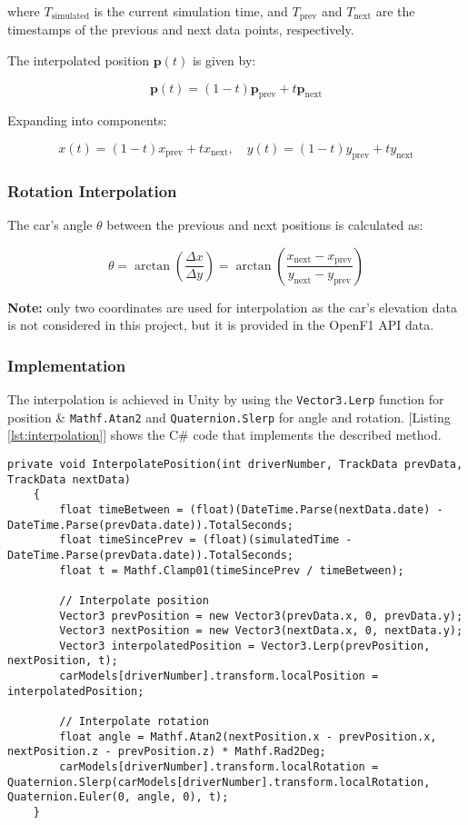 \documentclass[
	a4paper, %
	10pt, %
	unnumberedsections, %
	twoside, %
]{LTJournalArticle}
\begin{document}
where $T_{\text{simulated}}$ is the current simulation time, and $T_{\text{prev}}$ and $T_{\text{next}}$ are the timestamps of the previous and next data points, respectively.

The interpolated position $\mathbf{p}(t)$ is given by:

\[
\mathbf{p}(t) = (1 - t) \mathbf{p}_{\text{prev}} + t \mathbf{p}_{\text{next}}
\]

Expanding into components:

\[
x(t) = (1 - t) x_{\text{prev}} + t x_{\text{next}}, \quad y(t) = (1 - t) y_{\text{prev}} + t y_{\text{next}}
\]

\subsubsection{Rotation Interpolation}
The car’s angle $\theta$ between the previous and next positions is calculated as:

\[
\theta = \arctan \left( \frac{\Delta x}{\Delta y} \right) = \arctan \left( \frac{x_{\text{next}} - x_{\text{prev}}}{y_{\text{next}} - y_{\text{prev}}} \right)
\]

\textbf{Note:} only two coordinates are used for interpolation as the car's elevation data is not considered in this project, but it is provided in the OpenF1 API data.

\subsubsection{Implementation}

The interpolation is achieved in Unity by using the \verb|Vector3.Lerp| function for position \& \verb|Mathf.Atan2| and \verb|Quaternion.Slerp| for angle and rotation. 
[Listing \ref{lst:interpolation}] shows the C\# code that implements the described method.

\begin{lstlisting}[caption=Interpolation of Car Position and Rotation, label=lst:interpolation]
    private void InterpolatePosition(int driverNumber, TrackData prevData, TrackData nextData)
    {
        float timeBetween = (float)(DateTime.Parse(nextData.date) - DateTime.Parse(prevData.date)).TotalSeconds;
        float timeSincePrev = (float)(simulatedTime - DateTime.Parse(prevData.date)).TotalSeconds;
        float t = Mathf.Clamp01(timeSincePrev / timeBetween);

        // Interpolate position
        Vector3 prevPosition = new Vector3(prevData.x, 0, prevData.y);
        Vector3 nextPosition = new Vector3(nextData.x, 0, nextData.y);
        Vector3 interpolatedPosition = Vector3.Lerp(prevPosition, nextPosition, t);
        carModels[driverNumber].transform.localPosition = interpolatedPosition;

        // Interpolate rotation
        float angle = Mathf.Atan2(nextPosition.x - prevPosition.x, nextPosition.z - prevPosition.z) * Mathf.Rad2Deg;
        carModels[driverNumber].transform.localRotation = Quaternion.Slerp(carModels[driverNumber].transform.localRotation, Quaternion.Euler(0, angle, 0), t);
    }
\end{lstlisting}
\end{document}
